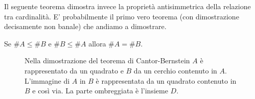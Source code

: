 Il seguente teorema dimostra invece la proprietà antisimmetrica 
della relazione tra cardinalità. 
E' probabilmente il primo vero teorema 
(con dimostrazione decisamente non banale) 
che andiamo a dimostrare.

\begin{theorem}%
  \label{th:cantor_bernstein}%
  Se $\#A \le \#B$ e $\#B \le \#A$ allora $\#A = \#B$.
\end{theorem}
%
\begin{figure}
  \centering
  \caption{
  Nella dimostrazione del teorema di Cantor-Bernstein
  $A$ è rappresentato da un quadrato e $B$ da un cerchio contenuto
  in $A$. L'immagine di $A$ in $B$ è rappresentata da un quadrato contenuto
  in $B$ e così via. La parte ombreggiata è l'insieme $D$.
  }
  \label{fig:omotetia}
\end{figure}
%
